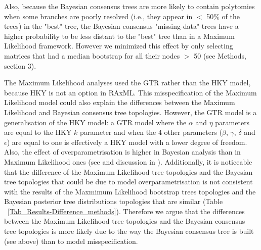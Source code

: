 \documentclass[12pt,letterpaper]{article}
\begin{document}
Also, because the Bayesian consensus trees are more likely to contain polytomies when some branches are poorly resolved (i.e., they appear in $<$ 50\% of the trees) in the "best" tree, the Bayesian consensus "missing-data" trees have a higher probability to be less distant to the "best" tree than in a Maximum Likelihood framework. However we minimized this effect by only selecting matrices that had a median bootstrap for all their nodes $>$ 50 (see Methods, section 3).

The Maximum Likelihood analyses used the GTR rather than the HKY model, because HKY is not an option in RAxML. This misspecification of the Maximum Likelihood model could also explain the differences between the Maximum Likelihood and Bayesian consensus tree topologies. However, the GTR model is a generalisation of the HKY model: a GTR model where the $\alpha$ and $\eta$ parameters are equal to the HKY $k$ parameter and when the 4 other parameters ($\beta$, $\gamma$, $\delta$ and $\epsilon$) are equal to one is effectively a HKY model with a lower degree of freedom. Also, the effect of overparametrisation is higher in Bayesian analysis than in Maximum Likelihood ones (see \citealt{Buckley01052002} and discussion in \citealt{douadycomparison2003}).
Additionally, it is noticeable that the difference of the Maximum Likelihood tree topologies and the Bayesian tree topologies that could be due to model overparametrisation is not consistent with the results of the Maxmimum Likelihood bootstrap trees topologies and the Bayesian posterior tree distributions topologies that are similar (Table ~\ref{Tab_Results-Difference_methods}). Therefore we argue that the differences between the Maximum Likelihood tree topologies and the Bayesian consensus tree topologies is more likely due to the way the Bayesian consensus tree is built (see above) than to model misspecification.
\end{document}
